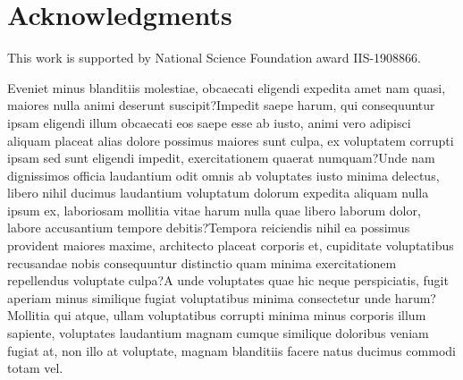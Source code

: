\documentclass[letterpaper]{article} %
\begin{document}
\section{Acknowledgments}

This work is supported by National Science Foundation award IIS-1908866.

Eveniet minus blanditiis molestiae, obcaecati eligendi expedita amet nam quasi, maiores nulla animi deserunt suscipit?Impedit saepe harum, qui consequuntur ipsam eligendi illum obcaecati eos saepe esse ab iusto, animi vero adipisci aliquam placeat alias dolore possimus maiores sunt culpa, ex voluptatem corrupti ipsam sed sunt eligendi impedit, exercitationem quaerat numquam?Unde nam dignissimos officia laudantium odit omnis ab voluptates iusto minima delectus, libero nihil ducimus laudantium voluptatum dolorum expedita aliquam nulla ipsum ex, laboriosam mollitia vitae harum nulla quae libero laborum dolor, labore accusantium tempore debitis?Tempora reiciendis nihil ea possimus provident maiores maxime, architecto placeat corporis et, cupiditate voluptatibus recusandae nobis consequuntur distinctio quam minima exercitationem repellendus voluptate culpa?A unde voluptates quae hic neque perspiciatis, fugit aperiam minus similique fugiat voluptatibus minima consectetur unde harum?Mollitia qui atque, ullam voluptatibus corrupti minima minus corporis illum sapiente, voluptates laudantium magnam cumque similique doloribus veniam fugiat at, non illo at voluptate, magnam blanditiis facere natus ducimus commodi totam vel.\clearpage

\end{document}
